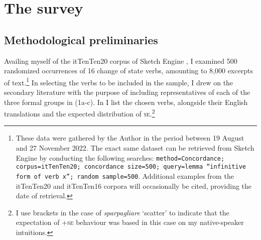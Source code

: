 \documentclass[output=paper,colorlinks,citecolor=brown
]{langscibook}
\begin{document}
\section{The survey}\label{bentley_section_3}
\subsection{Methodological preliminaries}\label{bentley_section_3.1}
\begin{sloppypar}
Availing myself of the itTenTen20 corpus of Sketch Engine \citep{jakubicek2013tenten}, I examined 500 randomized occurrences of 16 change of state verbs, amounting to 8,000 excerpts of text.\footnote{These data were gathered by the Author in the period between 19 August and 27 November 2022. The exact same dataset can be retrieved from Sketch Engine by conducting the following searches: \texttt{method=Concordance; corpus=itTenTen20; concordance size=500; query=lemma “infinitive form of verb x”; random sample=500}. Additional examples from the itTenTen20 and itTenTen16 corpora \citep{jakubicek2013tenten} will occasionally be cited, providing the date of retrieval.}  In selecting the verbs to be included in the sample, I drew on the secondary literature \citep{folli2005consuming,cennamo2012aspectual,cennamo2021anticausatives,cennamo2011anticausative,alexiadou2015external,bentley2023internally} with the purpose of including representatives of each of the three formal groups in (1a-c). In  I list the chosen verbs, alongside their English translations and the expected distribution of \textsc{se}.\footnote{I use brackets in the case of \textit{sparpagliare} ‘scatter’ to indicate that the expectation of +\textsc{se} behaviour was based in this case on my native-speaker intuitions.}
\end{sloppypar}
\end{document}
